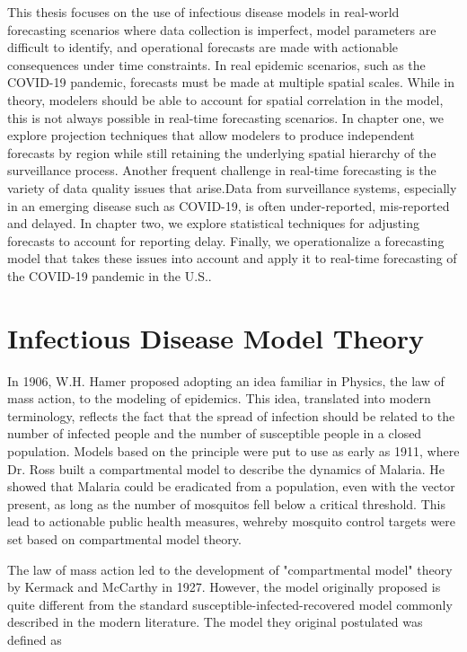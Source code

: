 \documentclass{umassthesis}          %
\begin{document}
   This thesis focuses on the use of infectious disease models in real-world forecasting scenarios where data collection is imperfect, model parameters are difficult to identify, and operational forecasts are made with actionable consequences under time constraints. In real epidemic scenarios, such as the COVID-19 pandemic, forecasts must be made at multiple spatial scales. While in theory, modelers should be able to account for spatial correlation in the model, this is not always possible in real-time forecasting scenarios. In chapter one, we explore projection techniques that allow modelers to produce independent forecasts by region while still retaining the underlying spatial hierarchy  of the surveillance process. Another frequent challenge in real-time forecasting is the variety of data quality issues that arise.Data from surveillance systems, especially in an emerging disease such as COVID-19, is often under-reported, mis-reported and delayed. In chapter two, we explore statistical techniques for adjusting forecasts to account for reporting delay.  Finally, we operationalize a forecasting model that takes these issues into account and apply it to real-time forecasting of the COVID-19 pandemic in the U.S.. 
   
\section{Infectious Disease Model Theory}
In 1906, W.H. Hamer proposed adopting an idea familiar in Physics, the law of mass action, to the modeling of epidemics. This idea, translated into modern terminology, reflects the fact that the spread of infection should be related to the number of infected people and the number of susceptible people in a closed population. Models based on the principle were put to use as early as 1911, where Dr. Ross built a compartmental model to describe the dynamics of Malaria. He showed that Malaria could be eradicated from a population, even with the vector present, as long as the number of mosquitos fell below a critical threshold. This lead to actionable public health measures, wehreby mosquito control targets were set based on compartmental model theory. 

The law of mass action led to the development of "compartmental model" theory by Kermack and McCarthy in 1927. However, the model originally proposed is quite different from the standard susceptible-infected-recovered model commonly described in the modern literature. The model they original postulated was defined as 
\end{document}

